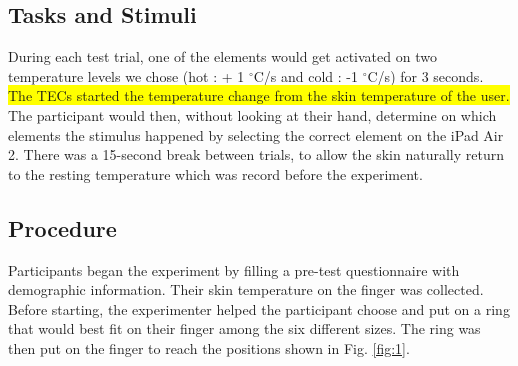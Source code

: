 \documentclass[preprint,12pt]{elsarticle}
\begin{document}
\subsection{Tasks and Stimuli}
During each test trial, one of the elements would get activated on two temperature levels we chose (hot : + 1 $^{\circ}$C/s and cold : -1 $^{\circ}$C/s) for 3 seconds. \colorbox{yellow}{The TECs started the temperature change from the skin temperature of the user.} The participant would then, without looking at their hand, determine on which elements the stimulus happened by selecting the correct element on the iPad Air 2. There was a 15-second  break between trials, to allow the skin naturally return to the resting temperature which was record before the experiment.

\subsection{Procedure}

Participants began the experiment by filling a pre-test questionnaire with demographic information. Their skin temperature on the finger was collected. Before starting, the experimenter helped the participant choose and put on a ring that would best fit on their finger among the six different sizes. The ring was then put on the finger to reach the positions shown in Fig. \ref{fig:1}.
\end{document}
